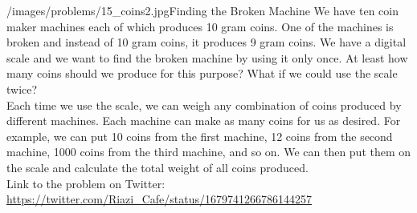 \begin{problem}{/images/problems/15_coins2.jpg}{Finding the Broken Machine}
	We have ten coin maker machines each of which produces 10 gram coins. One of the machines is broken and instead of 10 gram coins, it produces 9 gram coins. We have a digital scale and we want to find the broken machine by using it only once. At least how many coins should we produce for this purpose? What if we could use the scale twice? \\[0.2cm]

Each time we use the scale, we can weigh any combination of coins produced by different machines. Each machine can make as many coins for us as desired. For example, we can put 10 coins from the first machine, 12 coins from the second machine, 1000 coins from the third machine, and so on. We can then put them on the scale and calculate the total weight of all coins produced.\\[0.2cm]

Link to the problem on Twitter:  \url{https://twitter.com/Riazi_Cafe/status/1679741266786144257}
\end{problem}

